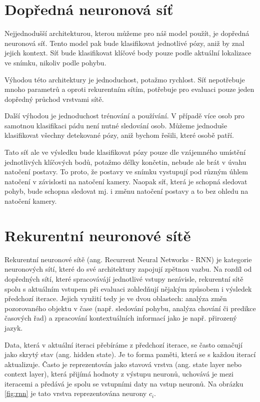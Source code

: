 \section{Dopředná neuronová síť}
Nejjednodušší architekturou, kterou můžeme pro náš model použít, je dopředná
neuronová síť. Tento model pak bude klasifikovat jednotlivé pózy, aniž by znal
jejich kontext. Síť bude klasifikovat klíčové body pouze podle aktuální
lokalizace ve snímku, nikoliv podle pohybu.

Výhodou této architektury je jednoduchost, potažmo rychlost. Síť nepotřebuje
mnoho parametrů a oproti rekurentním sítím, potřebuje pro evaluaci pouze jeden
dopředný průchod vrstvami sítě.

Další výhodou je jednoduchost trénování a používání. V případě více osob pro
samotnou klasifikaci pádu není nutné sledování osob. Můžeme jednoduše
klasifikovat všechny detekované pózy, aniž bychom řešili, které osobě patří.

Tato síť ale ve výsledku bude klasifikovat pózy pouze dle vzájemného umístění
jednotlivých klíčových bodů, potažmo délky končetin, nebude ale brát v úvahu
natočení postavy. To proto, že postavy ve snímku vystupují pod různým úhlem
natočení v závislosti na natočení kamery. Naopak síť, která je schopná sledovat
pohyb, bude schopna sledovat mj. i změnu natočení postavy a to bez ohledu na
natočení kamery.

\section{Rekurentní neuronové sítě}

Rekurentní neuronové sítě (ang. Recurrent Neural Networks - RNN) je kategorie
neuronových sítí, které do své architektury zapojují zpětnou vazbu. Na rozdíl
od dopředných sítí, které spracovávájí jednotlivé vstupy nezávisle, rekurentní
sítě spolu s aktuálním vstupem při evaluaci zohledňují nějakým způsobem i
výsledek předchozí iterace. Jejich využití tedy je ve dvou oblastech: analýza
změn pozorovaného objektu v čase (např. sledování pohybu, analýza chování či
predikce časových řad) a zpracování kontextuálních informací jako je např.
přirozený jazyk.

Data, která v aktuální iteraci přebíráme z předchozí iterace, se často označují
jako skrytý stav (ang. hidden state). Je to forma paměti, která se s každou
iterací aktualizuje. Často je reprezentován jako stavová vrstva (ang. state
layer nebo context layer), která přijímá hodnoty z výstupu neuronů, uchovává je
mezi iteracemi a předává je spolu se vstupními daty na vstup neuronů. Na
obrázku \ref{fig:rnn} je tato vrstva reprezentována neurony $c_i$.

